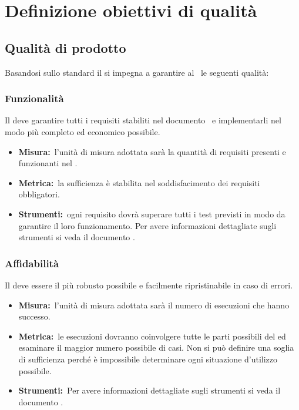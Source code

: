
\section{Definizione obiettivi di qualità}
\label{definizioneObbiettiviDiQualita}
  \subsection{Qualità di prodotto}
  \label{qualitaDiProdotto}
	Basandosi sullo standard  il  si impegna a garantire al  \PROGETTO\ le seguenti qualità:
	\subsubsection{Funzionalità}
	\label{funzionalita}
		Il  deve garantire tutti i requisiti stabiliti nel documento \ARdoc\ e implementarli nel modo più completo ed economico possibile.
		\begin{itemize}
			\item \textbf{Misura:}\ l'unità di misura adottata sarà la quantità di requisiti presenti e funzionanti nel .
			\item \textbf{Metrica:}\ la sufficienza è stabilita nel soddisfacimento dei requisiti obbligatori.
			\item \textbf{Strumenti:}\ ogni requisito dovrà superare tutti i test previsti in modo da garantire il loro funzionamento. Per avere informazioni dettagliate sugli strumenti si veda il documento \NPdoc. 
		\end{itemize}
	\subsubsection{Affidabilità}
	\label{affidabilita}
		Il  deve essere il più robusto possibile e facilmente ripristinabile in caso di errori.
		\begin{itemize}
			\item \textbf{Misura:}\ l'unità di misura adottata sarà il numero di esecuzioni che hanno successo.
			\item \textbf{Metrica:}\ le esecuzioni dovranno coinvolgere tutte le parti possibili del  ed esaminare il maggior numero possibile di casi. Non si può definire una soglia di sufficienza perché è impossibile determinare ogni situazione d'utilizzo possibile.
			\item \textbf{Strumenti:}\ Per avere informazioni dettagliate sugli strumenti si veda il documento \NPdoc.
		\end{itemize}
